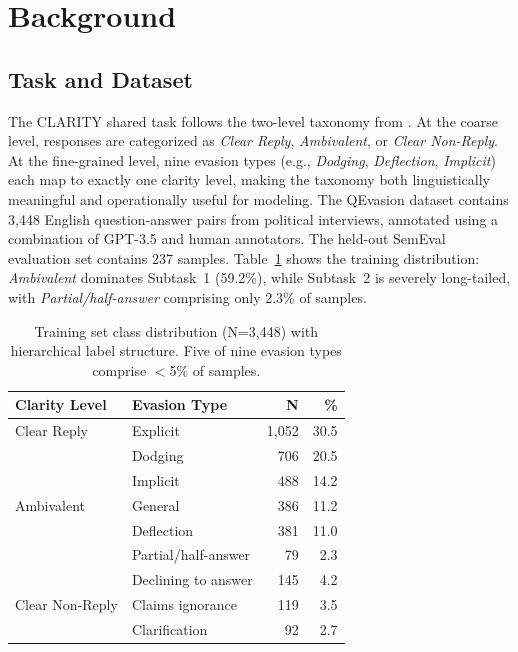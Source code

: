 \documentclass[11pt]{article}
\begin{document}
\section{Background}

\subsection{Task and Dataset}

The CLARITY shared task follows the two-level taxonomy from \citet{thomas2024clarity}. At the coarse level, responses are categorized as \textit{Clear Reply}, \textit{Ambivalent}, or \textit{Clear Non-Reply}. At the fine-grained level, nine evasion types (e.g., \textit{Dodging}, \textit{Deflection}, \textit{Implicit}) each map to exactly one clarity level, making the taxonomy both linguistically meaningful and operationally useful for modeling. The QEvasion dataset \citep{thomas2024clarity} contains 3,448 English question-answer pairs from political interviews, annotated using a combination of GPT-3.5 and human annotators. The held-out SemEval evaluation set contains 237 samples. Table~\ref{tab:class_dist} shows the training distribution: \textit{Ambivalent} dominates Subtask~1 (59.2\%), while Subtask~2 is severely long-tailed, with \textit{Partial/half-answer} comprising only 2.3\% of samples.

\begin{table}[t]
\centering
\small
\begin{tabular}{@{}llrr@{}}
\toprule
\textbf{Clarity Level} & \textbf{Evasion Type} & \textbf{N} & \textbf{\%} \\
\midrule
Clear Reply & Explicit & 1,052 & 30.5 \\
\midrule
\multirow{5}{*}{Ambivalent} & Dodging & 706 & 20.5 \\
 & Implicit & 488 & 14.2 \\
 & General & 386 & 11.2 \\
 & Deflection & 381 & 11.0 \\
 & Partial/half-answer & 79 & 2.3 \\
\midrule
\multirow{3}{*}{Clear Non-Reply} & Declining to answer & 145 & 4.2 \\
 & Claims ignorance & 119 & 3.5 \\
 & Clarification & 92 & 2.7 \\
\bottomrule
\end{tabular}
\caption{Training set class distribution (N=3,448) with hierarchical label structure. Five of nine evasion types comprise $<$5\% of samples.}
\label{tab:class_dist}
\end{table}
\end{document}
